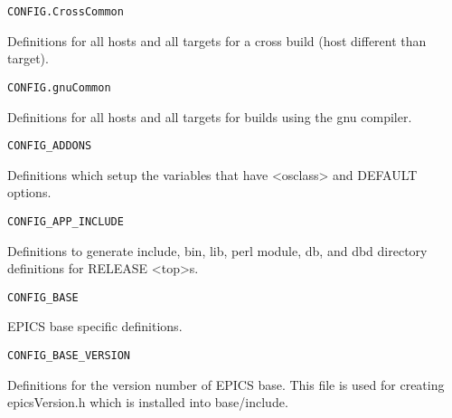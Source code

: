 \begin{verbatim}CONFIG.CrossCommon
\end{verbatim}\begin{description}\item Definitions for all hosts and all targets for a cross build (host different than target).

\end{description}\begin{verbatim}CONFIG.gnuCommon
\end{verbatim}\begin{description}\item Definitions for all hosts and all targets for builds using the gnu compiler.

\end{description}\begin{verbatim}CONFIG_ADDONS
\end{verbatim}\begin{description}\item Definitions which setup the variables that have \textless{}osclass\textgreater{} and DEFAULT options.

\end{description}\begin{verbatim}CONFIG_APP_INCLUDE
\end{verbatim}\begin{description}\item Definitions to generate include, bin, lib, perl module, db, and dbd directory definitions for RELEASE \textless{}top\textgreater{}s.

\end{description}\begin{verbatim}CONFIG_BASE
\end{verbatim}\begin{description}\item EPICS base specific definitions.

\end{description}\begin{verbatim}CONFIG_BASE_VERSION
\end{verbatim}\begin{description}\item Definitions for the version number of EPICS base. This file is used for creating epicsVersion.h which is installed 
into base/include.


\end{description}
